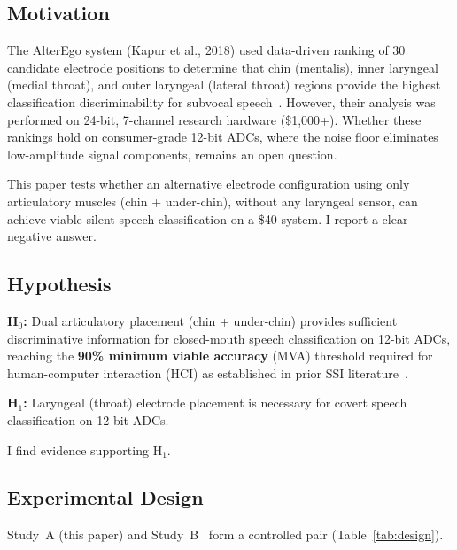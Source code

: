 \documentclass{article}
\begin{document}
\subsection{Motivation}

The AlterEgo system (Kapur et al., 2018) used data-driven ranking of 30 candidate electrode positions to determine that chin (mentalis), inner laryngeal (medial throat), and outer laryngeal (lateral throat) regions provide the highest classification discriminability for subvocal speech~\cite{kapur2018}. However, their analysis was performed on 24-bit, 7-channel research hardware (\$1{,}000+). Whether these rankings hold on consumer-grade 12-bit ADCs, where the noise floor eliminates low-amplitude signal components, remains an open question.

This paper tests whether an alternative electrode configuration using only articulatory muscles (chin + under-chin), without any laryngeal sensor, can achieve viable silent speech classification on a \$40 system. I report a clear negative answer.

\subsection{Hypothesis}

\noindent\textbf{H$_0$:} Dual articulatory placement (chin + under-chin) provides sufficient discriminative information for closed-mouth speech classification on 12-bit ADCs, reaching the \textbf{90\% minimum viable accuracy} (MVA) threshold required for human-computer interaction (HCI) as established in prior SSI literature~\cite{kapur2018}.

\noindent\textbf{H$_1$:} Laryngeal (throat) electrode placement is necessary for covert speech classification on 12-bit ADCs.

I find evidence supporting H$_1$.

\subsection{Experimental Design}

Study~A (this paper) and Study~B~\cite{kho2026companion} form a controlled pair (Table~\ref{tab:design}).
\end{document}
